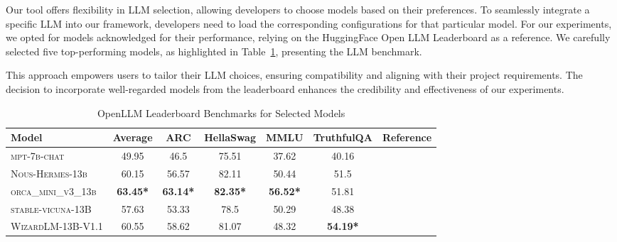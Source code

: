 Our tool offers flexibility in LLM selection, allowing developers to choose models based on their preferences. To seamlessly integrate a specific LLM into our framework, developers need to load the corresponding configurations for that particular model. For our experiments, we opted for models acknowledged for their performance, relying on the HuggingFace\cite{noauthor_hugging_2023} Open LLM Leaderboard\cite{open-llm-leaderboard} as a reference. We carefully selected five top-performing models, as highlighted in Table~\ref{tab:selected_models}, presenting the LLM benchmark.

This approach empowers users to tailor their LLM choices, ensuring compatibility and aligning with their project requirements. The decision to incorporate well-regarded models from the leaderboard enhances the credibility and effectiveness of our experiments.

\begin{table}[htbp]
    \centering    
    \begin{tabular}{l | c | c | c | c | c | r}
        \textbf{Model} & \textbf{Average} & \textbf{ARC} & \textbf{HellaSwag} & \textbf{MMLU} & \textbf{TruthfulQA} & \textbf{Reference} \\
        \hline
        \scriptsize\textsc{mpt-7b-chat} & 49.95 & 46.5 & 75.51 & 37.62 & 40.16 & \cite{MosaicML2023Introducing}\cite{noauthor_mosaicmlmpt-7b-chat_2023}  \\
        \scriptsize\textsc{Nous-Hermes-13b} & 60.15 & 56.57 & 82.11 & 50.44 & 51.5 & \cite{noauthor_nousresearchnous-hermes-13b_nodate} \\
        \scriptsize\textsc{orca\_mini\_v3\_13b}  & \textbf{63.45*} & \textbf{63.14*} & \textbf{82.35*} & \textbf{56.52*} & 51.81 & \cite{noauthor_pankajmathurorca_mini_v3_13b_2023}\cite{mukherjee2023orca}\\
        \scriptsize\textsc{stable-vicuna-13B}  & 57.63 & 53.33 & 78.5 & 50.29 & 48.38 & \cite{noauthor_theblokestable-vicuna-13b-hf_2023} \\
        \scriptsize\textsc{WizardLM-13B-V1.1}  & 60.55 & 58.62 & 81.07 & 48.32 & \textbf{54.19*} & \cite{noauthor_theblokewizardlm-13b-v1-1-superhot-8k-fp16_nodate}\cite{vicuna2023} \\
    \end{tabular}
\caption{OpenLLM Leaderboard Benchmarks for Selected Models}
\label{tab:selected_models}
\end{table}


